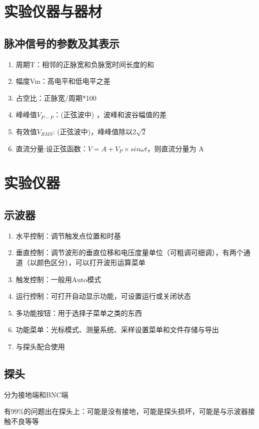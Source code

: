 \documentclass{ctexart}
\begin{document}
\section{实验仪器与器材}
\subsection{脉冲信号的参数及其表示}
\begin{enumerate}
    \item 周期T：相邻的正脉宽和负脉宽时间长度的和
    \item 幅度Vm：高电平和低电平之差
    \item 占空比：正脉宽/周期*100%
    \item 峰峰值$V_{P-P}$：(正弦波中) ，波峰和波谷幅值的差
    \item 有效值$V_{RMS}$: (正弦波中)，峰峰值除以2$\sqrt{2}$
    \item 直流分量:设正弦函数：$V=A+V_P \times sin \omega t $，则直流分量为 A
\end{enumerate}

\section{实验仪器}
\subsection{示波器}
\begin{enumerate}
    \item 水平控制：调节触发点位置和时基
    \item 垂直控制：调节波形的垂直位移和电压度量单位（可粗调可细调），有两个通道（以颜色区分），可以打开波形运算菜单
    \item 触发控制：一般用Auto模式
    \item 运行控制：可打开自动显示功能，可设置运行或关闭状态
    \item 多功能按钮：用于选择子菜单之类的东西
    \item 功能菜单：光标模式、测量系统、采样设置菜单和文件存储与导出
    \item 与探头配合使用
\end{enumerate}

\subsection{探头}
分为接地端和BNC端

有99\%的问题出在探头上：可能是没有接地，可能是探头损坏，可能是与示波器接触不良等等
\end{document}

